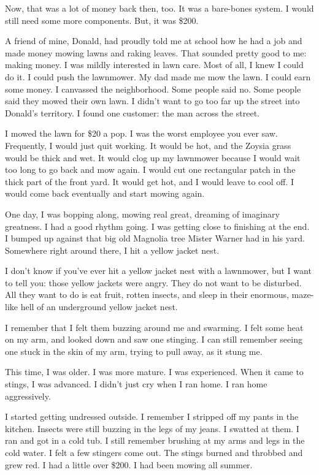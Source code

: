 Now, that was a lot of money back then, too.  It was a bare-bones system.  I would still need some more components.  But, it was \$200.

A friend of mine, Donald, had proudly told me at school how he had a job and made money mowing lawns and raking leaves.  That sounded pretty good to me:  making money.  I was mildly interested in lawn care.  Most of all, I knew I could do it.  I could push the lawnmower.  My dad made me mow the lawn.  I could earn some money.  I canvassed the neighborhood.  Some people said no.  Some people said they mowed their own lawn.  I didn't want to go too far up the street into Donald's territory.  I found one customer:  the man across the street.

I mowed the lawn for \$20 a pop.  I was the worst employee you ever saw.  Frequently, I would just quit working.  It would be hot, and the Zoysia grass would be thick and wet.  It would clog up my lawnmower because I would wait too long to go back and mow again.  I would cut one rectangular patch in the thick part of the front yard.  It would get hot, and I would leave to cool off.  I would come back eventually and start mowing again.

One day, I was bopping along, mowing real great, dreaming of imaginary greatness.  I had a good rhythm going. I was getting close to finishing at the end.  I bumped up against that big old Magnolia tree Mister Warner had in his yard.  Somewhere right around there, I hit a yellow jacket nest.

I don't know if you've ever hit a yellow jacket nest with a lawnmower, but I want to tell you:  those yellow jackets were angry.  They do not want to be disturbed.  All they want to do is eat fruit, rotten insects, and sleep in their enormous, maze-like hell of an underground yellow jacket nest.

I remember that I felt them buzzing around me and swarming.  I felt some heat on my arm, and looked down and saw one stinging.  I can still remember seeing one stuck in the skin of my arm, trying to pull away, as it stung me.

This time, I was older.  I was more mature.  I was experienced.  When it came to stings, I was advanced.  I didn't just cry when I ran home.  I ran home aggressively.

I started getting undressed outside.  I remember I stripped off my pants in the kitchen.  Insects were still buzzing in the legs of my jeans.  I swatted at them. I ran and got in a cold tub.  I still remember brushing at my arms and legs in the cold water.  I felt a few stingers come out.  The stings burned and throbbed and grew red.  I had a little over \$200.  I had been mowing all summer.

